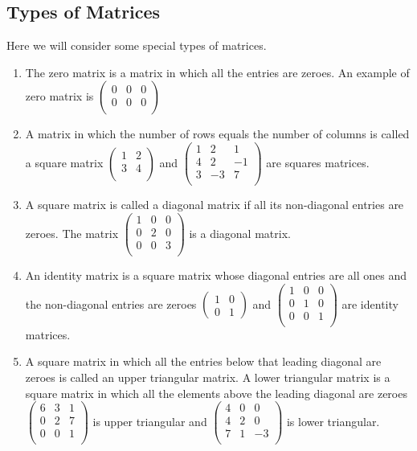 \documentclass[11pt,a4paper]{article}
\theoremstyle{definition}
\begin{document}
\subsection{Types of Matrices}
Here we will consider some special types of matrices.
\begin{enumerate}
\item The zero matrix is a matrix in which all the entries are zeroes. An example of zero matrix is $
\begin{pmatrix}
0&0&0\\0&0&0\\
\end{pmatrix}
$

\item A matrix in which the number of rows equals the number of columns is called a square matrix
$
\begin{pmatrix}
1&2\\3&4\\
\end{pmatrix}
$ and 
$
\begin{pmatrix}
1&2&1\\4&2&-1\\3&-3&7\\
\end{pmatrix}
$ are squares matrices.

\item A square matrix is called a diagonal matrix if all its non-diagonal entries are zeroes. The matrix 
$
\begin{pmatrix}
1&0&0\\0&2&0\\0&0&3\\
\end{pmatrix}
$ is a diagonal matrix.

\item An identity matrix is a square matrix whose diagonal entries are all ones and the non-diagonal entries are zeroes
$
\begin{pmatrix}
1&0\\ 0&1
\end{pmatrix}
$ and 
$
\begin{pmatrix}
1&0&0\\ 0&1&0\\0&0&1\\
\end{pmatrix}
$ are identity matrices.

\item A square matrix in which all the entries below that leading diagonal are zeroes is called an upper triangular matrix. A lower triangular matrix is a square matrix in which all the elements above the leading diagonal are zeroes 
$
\begin{pmatrix}
6&3&1\\0&2&7\\0&0&1\\
\end{pmatrix}
$ is upper triangular and $
\begin{pmatrix}
4&0&0\\4&2&0\\7&1&-3\\
\end{pmatrix}
$ is lower triangular.


\end{enumerate}
\end{document}
